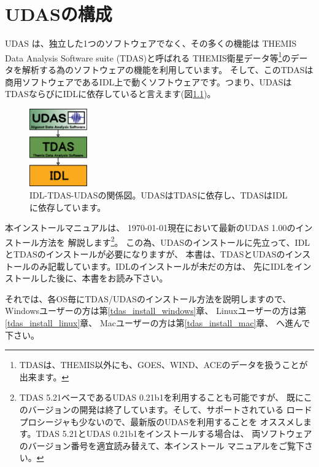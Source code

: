 \documentclass[a4j]{jbook}
\begin{document}
\chapter{UDASの構成}
UDAS は、独立した1つのソフトウェアでなく、その多くの機能は
THEMIS Data Analysis Software suite (TDAS)と呼ばれる
THEMIS衛星データ等\footnote{TDASは、THEMIS以外にも、GOES、WIND、ACEのデータを扱うことが出来ます。}のデータを解析する為のソフトウェアの機能を利用しています。
そして、このTDASは商用ソフトウェアであるIDL上で動くソフトウェアです。つまり、UDASは
TDASならびにIDLに依存していると言えます(図\ref{udas_deploy})。
\begin{figure}[H]
\begin{center}
\includegraphics[width=2.5cm]{images/udas_deploy.eps}
\caption{IDL-TDAS-UDASの関係図。UDASはTDASに依存し、TDASはIDLに依存しています。}
\label{udas_deploy}
\end{center}
\end{figure}
本インストールマニュアルは、
\today 現在において最新のUDAS 1.00のインストール方法を
解説します\footnote{
TDAS 5.21ベースであるUDAS 0.21b1を利用することも可能ですが、
既にこのバージョンの開発は終了しています。そして、サポートされている
ロードプロシージャも少ないので、最新版のUDASを利用することを
オススメします。TDAS 5.21とUDAS 0.21b1をインストールする場合は、
両ソフトウェアのバージョン番号を適宜読み替えて、本インストール
マニュアルをご覧下さい。}。
この為、UDASのインストールに先立って、IDLとTDASのインストールが必要になりますが、
本書は、TDASとUDASのインストールのみ記載しています。IDLのインストールが未だの方は、
先にIDLをインストールした後に、本書をお読み下さい。

それでは、各OS毎にTDAS/UDASのインストール方法を説明しますので、
Windowsユーザーの方は第\ref{tdas_install_windows}章、
Linuxユーザーの方は第\ref{tdas_install_linux}章、
Macユーザーの方は第\ref{tdas_install_mac}章、
へ進んで下さい。
\end{document}
